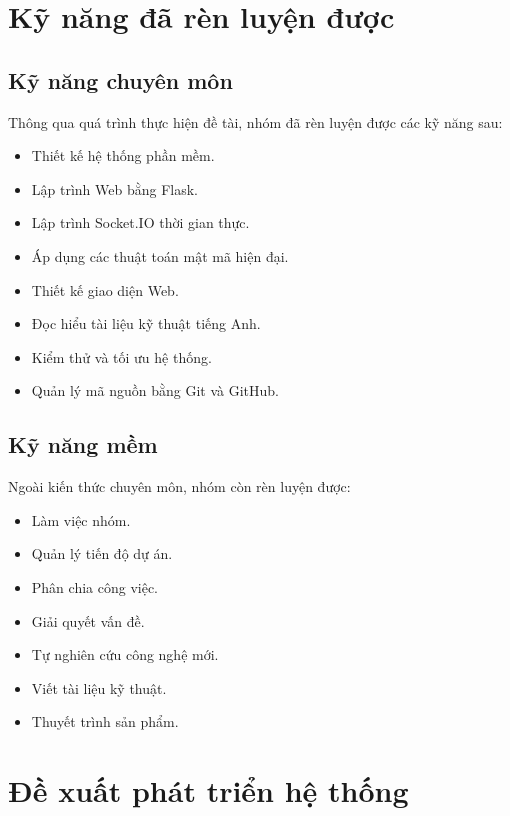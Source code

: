 \section{Kỹ năng đã rèn luyện được}

\subsection{Kỹ năng chuyên môn}

Thông qua quá trình thực hiện đề tài, nhóm đã rèn luyện được các kỹ năng sau:

\begin{itemize}
    \item Thiết kế hệ thống phần mềm.
    \item Lập trình Web bằng Flask.
    \item Lập trình Socket.IO thời gian thực.
    \item Áp dụng các thuật toán mật mã hiện đại.
    \item Thiết kế giao diện Web.
    \item Đọc hiểu tài liệu kỹ thuật tiếng Anh.
    \item Kiểm thử và tối ưu hệ thống.
    \item Quản lý mã nguồn bằng Git và GitHub.
\end{itemize}

\subsection{Kỹ năng mềm}

Ngoài kiến thức chuyên môn, nhóm còn rèn luyện được:

\begin{itemize}
    \item Làm việc nhóm.
    \item Quản lý tiến độ dự án.
    \item Phân chia công việc.
    \item Giải quyết vấn đề.
    \item Tự nghiên cứu công nghệ mới.
    \item Viết tài liệu kỹ thuật.
    \item Thuyết trình sản phẩm.
\end{itemize}

\section{Đề xuất phát triển hệ thống}

